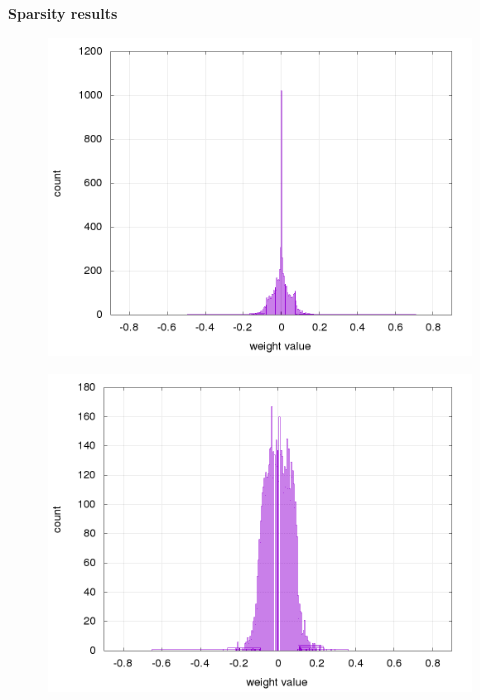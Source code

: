 \documentclass[xcolor=dvipsnames]{beamer}
\begin{document}
\begin{frame}{\bf Sparsity results}

\begin{figure}[!htb]
\centering
\begin{minipage}{.5\textwidth}
  \centering
  \includegraphics[scale=0.15]{../../results/rl_arcade/fnn_trained_0/supervised/layer_1_histogram.png}
  \label{img:FNN sparse weights histogram}
\end{minipage}%
\begin{minipage}{.5\textwidth}
  \centering
  \includegraphics[scale=0.15]{../../results/rl_arcade/fnn_trained_5/supervised/layer_1_histogram.png}
  \label{img:FNN no sparse weights histogram}
\end{minipage}
\end{figure}


\end{frame}
\end{document}
